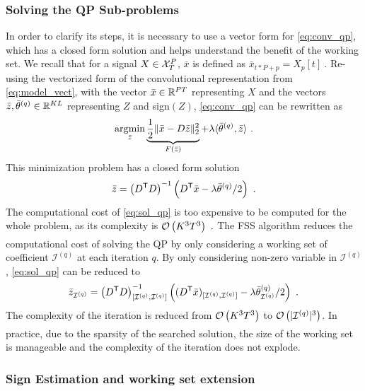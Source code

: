 \documentclass[../thesis.tex]{subfiles}
\begin{document}
\subsubsection{Solving the QP Sub-problems}
\label{par:solve_qp}
	In order to clarify its steps, it is necessary to use a vector form for \autoref{eq:conv_qp},
	which has a closed form solution and helps understand the benefit of the working set. We
	recall that for a signal $X\in{\mathcal X}_T^P$, $\bar x$ is defined as $\bar x_{t*P + p} = X_p[t]~.$ 
	Re-using the vectorized form of the convolutional representation from
	\autoref{eq:model_vect}, with the vector $\bar x \in {\mathbb{R}}^{PT}$ representing
	$X$ and the vectors $\bar z, \bar \theta^{(q)} \in{\mathbb{R}}^{KL}$ representing $Z$
	and sign$(Z)$, \autoref{eq:conv_qp} can be rewritten as
	\begin{equation}
		\label{eq:vect_qp}
		\operatorname*{\arg\!\min}_{\bar z} \underbrace{\frac{1}{2}\|\bar x - D\bar z \|_2^2}_{F(\bar z)}
						+ \lambda \langle\bar\theta^{(q)}, \bar z\rangle~.
	\end{equation}
	This minimization problem has a closed form solution
	\begin{equation}
		\label{eq:sol_qp}
		\bar z = \left(D^\mathsf{T} D\right)^{-1}
				  \left(D^\mathsf{T}\bar x - \lambda \bar \theta^{(q)}/2\right)~.
	\end{equation}
	The computational cost of \autoref{eq:sol_qp} is too expensive to be computed
	for the whole problem, as its complexity is $\underset{}{\mathcal O}\left(K^3T^3\right)~.$ The FSS algorithm
	reduces the computational cost of solving the QP by only considering a working
	set of coefficient $\mathcal I^{(q)}$ at each iteration $q$. By only considering
	non-zero variable in $\mathcal I^{(q)}$, \autoref{eq:sol_qp} can be reduced to
	\begin{equation}
		\label{eq:sol_qp_ws}
		\bar z_{\mathcal I^{(q)}} = \left(D^\mathsf{T} D
				\right)_{[\mathcal I^{(q)}, \mathcal I^{(q)}]}^{-1}
				\left((D^\mathsf{T}\bar x)_{[\mathcal I^{(q)}, \mathcal I^{(q)}]}
					  - \lambda \bar \theta^{(q)}_{\mathcal I^{(q)}}/2\right)~.
	\end{equation}
	The complexity of the iteration is reduced from $\underset{}{\mathcal O}\left(K^3T^3\right)$ to
	$\underset{}{\mathcal O}\left(|\mathcal I^{(q)}|^3\right)$. In practice, due to the sparsity of the searched
	solution, the size of the working set is manageable and the complexity of the
	iteration does not explode.


\subsubsection{Sign Estimation and working set extension}
\label{par:sign_estimate}
\end{document}
